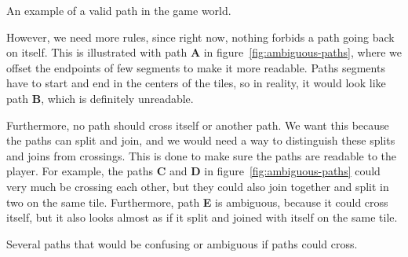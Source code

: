 \begin{center}
    \captionsetup{type=figure}
    \caption{An example of a valid path in the game world.}
    \label{fig:valid-path-example}
\end{center}

However, we need more rules, since right now, nothing forbids a path going back on itself.
This is illustrated with path \textbf{A} in figure~\ref{fig:ambiguous-paths}, where we offset the endpoints of few segments to make it more readable.
Paths segments have to start and end in the centers of the tiles, so in reality, it would look like path \textbf{B}, which is definitely unreadable.

Furthermore, no path should cross itself or another path.
We want this because the paths can split and join, and we would need a way to distinguish these splits and joins from crossings.
This is done to make sure the paths are readable to the player.
For example, the paths \textbf{C} and \textbf{D} in figure~\ref{fig:ambiguous-paths} could very much be crossing each other, but they could also join together and split in two on the same tile.
Furthermore, path \textbf{E} is ambiguous, because it could cross itself, but it also looks almost as if it split and joined with itself on the same tile.

\begin{center}
    \captionsetup{type=figure}
    \caption{Several paths that would be confusing or ambiguous if paths could cross.}
    \label{fig:ambiguous-paths}
\end{center}

